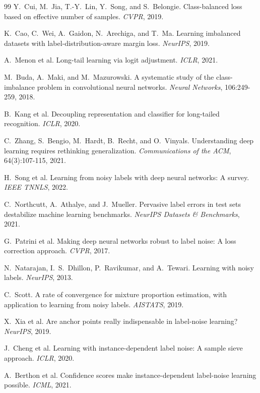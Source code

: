 \documentclass[11pt]{article}
\begin{document}
\begin{thebibliography}{99}
 Y.\ Cui, M.\ Jia, T.-Y.\ Lin, Y.\ Song, and S.\ Belongie. Class-balanced loss based on effective number of samples. \emph{CVPR}, 2019.

 K.\ Cao, C.\ Wei, A.\ Gaidon, N.\ Arechiga, and T.\ Ma. Learning imbalanced datasets with label-distribution-aware margin loss. \emph{NeurIPS}, 2019.

 A.\ Menon et al. Long-tail learning via logit adjustment. \emph{ICLR}, 2021.

 M.\ Buda, A.\ Maki, and M.\ Mazurowski. A systematic study of the class-imbalance problem in convolutional neural networks. \emph{Neural Networks}, 106:249-259, 2018.

 B.\ Kang et al. Decoupling representation and classifier for long-tailed recognition. \emph{ICLR}, 2020.

 C.\ Zhang, S.\ Bengio, M.\ Hardt, B.\ Recht, and O.\ Vinyals. Understanding deep learning requires rethinking generalization. \emph{Communications of the ACM}, 64(3):107-115, 2021.

 H.\ Song et al. Learning from noisy labels with deep neural networks: A survey. \emph{IEEE TNNLS}, 2022.

 C.\ Northcutt, A.\ Athalye, and J.\ Mueller. Pervasive label errors in test sets destabilize machine learning benchmarks. \emph{NeurIPS Datasets \& Benchmarks}, 2021.

 G.\ Patrini et al. Making deep neural networks robust to label noise: A loss correction approach. \emph{CVPR}, 2017.

 N.\ Natarajan, I.\ S.\ Dhillon, P.\ Ravikumar, and A.\ Tewari. Learning with noisy labels. \emph{NeurIPS}, 2013.

 C.\ Scott. A rate of convergence for mixture proportion estimation, with application to learning from noisy labels. \emph{AISTATS}, 2019.

 X.\ Xia et al. Are anchor points really indispensable in label-noise learning? \emph{NeurIPS}, 2019.

 J.\ Cheng et al. Learning with instance-dependent label noise: A sample sieve approach. \emph{ICLR}, 2020.

 A.\ Berthon et al. Confidence scores make instance-dependent label-noise learning possible. \emph{ICML}, 2021.


\end{thebibliography}
\end{document}
